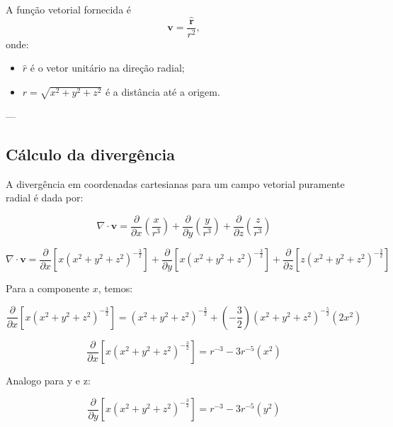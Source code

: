 \documentclass[a4paper,12pt]{article}
\begin{document}
A função vetorial fornecida é 
\begin{equation}
\mathbf{v} = \frac{\hat{\mathbf{r}}}{r^2},
\end{equation}
onde:
\begin{itemize}
    \item \( \hat{r} \) é o vetor unitário na direção radial;
    \item \( r = \sqrt{x^2 + y^2 + z^2} \) é a distância até a origem.
\end{itemize}

---

\subsection*{Cálculo da divergência}

A divergência em coordenadas cartesianas para um campo vetorial puramente radial é dada por:

\begin{equation}
\nabla \cdot \mathbf{v} = \frac{\partial}{\partial x}\left( \frac{x}{r^3}\right) + \frac{\partial}{\partial y}\left( \frac{y}{r^3}\right) + \frac{\partial}{\partial z}\left( \frac{z}{r^3}\right)
\end{equation}

\begin{equation}
    \nabla \cdot \mathbf{v} = \frac{\partial}{\partial x}\left[x(x^2+y^2+z^2)^{-\frac{3}{2}}\right] + \frac{\partial}{\partial y}\left[x(x^2+y^2+z^2)^{-\frac{3}{2}}\right] + \frac{\partial}{\partial z}\left[z(x^2+y^2+z^2)^{-\frac{3}{2}}\right]
\end{equation}

Para a componente \( x \), temos:

\begin{equation}
    \frac{\partial}{\partial x}\left[x(x^2+y^2+z^2)^{-\frac{3}{2}}\right] = (x^2+y^2+z^2)^{-\frac{3}{2}} + \left(-\frac{3}{2}\right)(x^2+y^2+z^2)^{-\frac{5}{2}}\left(2x^2\right)
\end{equation}

\begin{equation}
    \frac{\partial}{\partial x}\left[x(x^2+y^2+z^2)^{-\frac{3}{2}}\right] = r^{-3} - 3r^{-5}\left(x^2\right)
\end{equation}

Analogo para y e z:

\begin{equation}
    \frac{\partial}{\partial y}\left[x(x^2+y^2+z^2)^{-\frac{3}{2}}\right] = r^{-3} - 3r^{-5}\left(y^2\right)
\end{equation}
\end{document}
